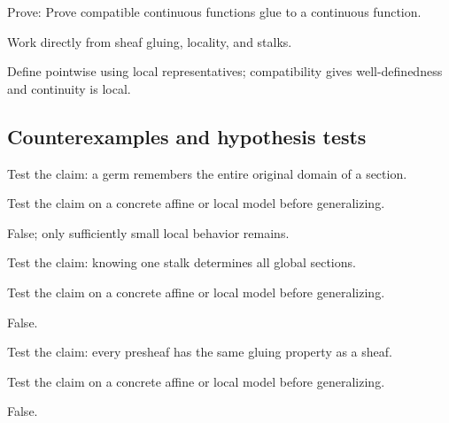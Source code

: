 \begin{exercise}\label{exr:vi13-expand-09}
Prove: Prove compatible continuous functions glue to a continuous function.
\end{exercise}
\begin{hint}
Work directly from sheaf gluing, locality, and stalks.
\end{hint}
\begin{solution}
Define pointwise using local representatives; compatibility gives well-definedness and continuity is local.
\end{solution}

\subsection*{Counterexamples and hypothesis tests}

\begin{exercise}\label{exr:vi13-expand-10}
Test the claim: a germ remembers the entire original domain of a section.
\end{exercise}
\begin{hint}
Test the claim on a concrete affine or local model before generalizing.
\end{hint}
\begin{solution}
False; only sufficiently small local behavior remains.
\end{solution}

\begin{exercise}\label{exr:vi13-expand-11}
Test the claim: knowing one stalk determines all global sections.
\end{exercise}
\begin{hint}
Test the claim on a concrete affine or local model before generalizing.
\end{hint}
\begin{solution}
False.
\end{solution}

\begin{exercise}\label{exr:vi13-expand-12}
Test the claim: every presheaf has the same gluing property as a sheaf.
\end{exercise}
\begin{hint}
Test the claim on a concrete affine or local model before generalizing.
\end{hint}
\begin{solution}
False.
\end{solution}

